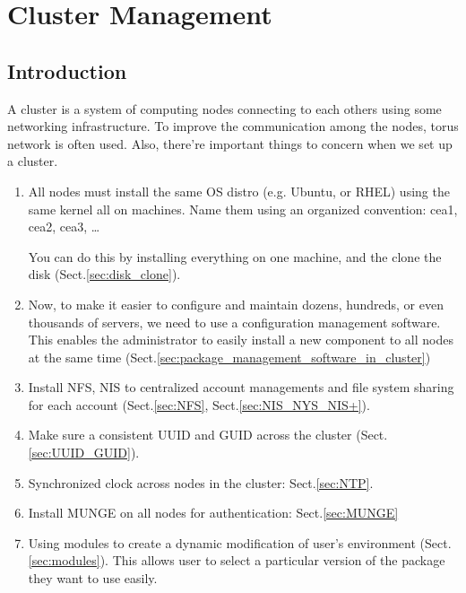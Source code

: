 \chapter{Cluster Management}
\label{chap:cluster_management}



\section{Introduction}

A cluster is a system of computing nodes connecting to each others using some
networking infrastructure. To improve the communication among the nodes, torus
network is often used. Also, there're important things to concern when we set up
a cluster.

\begin{enumerate}
  \item All nodes must install the same OS distro (e.g. Ubuntu, or RHEL)
  using the same kernel all on machines. Name them using an organized
  convention:  cea1, cea2, cea3, \ldots

You can do this by installing everything on one machine, and the clone the disk
(Sect.\ref{sec:disk_clone}). 

  \item Now, to make it easier to configure and maintain dozens, hundreds, or
  even thousands of servers, we need to use a configuration management software.
  This enables the administrator to easily install a new component to all
  nodes at the same time (Sect.\ref{sec:package_management_software_in_cluster})
  
  \item Install NFS, NIS to centralized account managements and file system
  sharing for each account (Sect.\ref{sec:NFS}, Sect.\ref{sec:NIS_NYS_NIS+}).
  
  \item Make sure a consistent UUID and GUID across the cluster
  (Sect.\ref{sec:UUID_GUID}). 
  
  \item Synchronized clock across nodes in the cluster:
  Sect.\ref{sec:NTP}.
  
  \item Install MUNGE on all nodes for authentication: Sect.\ref{sec:MUNGE}
  
  
  \item Using modules to create a dynamic modification of user's environment
  (Sect.\ref{sec:modules}). This allows user to select a particular version of
  the package they want to use easily.
  

\end{enumerate}
